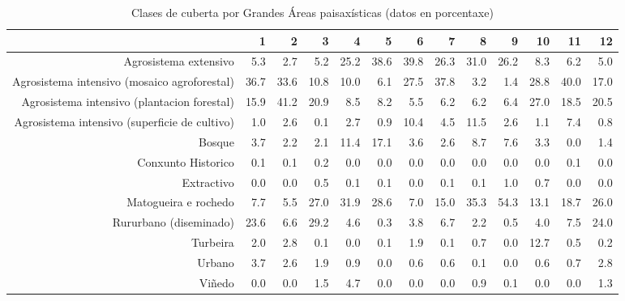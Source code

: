 \begin{table}[p]
\centering
\caption{Clases de cuberta por Grandes Áreas paisaxísticas (datos en porcentaxe)} 
\label{xtaboa2p}
\begin{tabular}{rrrrrrrrrrrrr}
  \hline
 & 1 & 2 & 3 & 4 & 5 & 6 & 7 & 8 & 9 & 10 & 11 & 12 \\ 
  \hline
Agrosistema extensivo & 5.3 & 2.7 & 5.2 & 25.2 & 38.6 & 39.8 & 26.3 & 31.0 & 26.2 & 8.3 & 6.2 & 5.0 \\ 
  Agrosistema intensivo (mosaico agroforestal) & 36.7 & 33.6 & 10.8 & 10.0 & 6.1 & 27.5 & 37.8 & 3.2 & 1.4 & 28.8 & 40.0 & 17.0 \\ 
  Agrosistema intensivo (plantacion forestal) & 15.9 & 41.2 & 20.9 & 8.5 & 8.2 & 5.5 & 6.2 & 6.2 & 6.4 & 27.0 & 18.5 & 20.5 \\ 
  Agrosistema intensivo (superficie de cultivo) & 1.0 & 2.6 & 0.1 & 2.7 & 0.9 & 10.4 & 4.5 & 11.5 & 2.6 & 1.1 & 7.4 & 0.8 \\ 
  Bosque & 3.7 & 2.2 & 2.1 & 11.4 & 17.1 & 3.6 & 2.6 & 8.7 & 7.6 & 3.3 & 0.0 & 1.4 \\ 
  Conxunto Historico & 0.1 & 0.1 & 0.2 & 0.0 & 0.0 & 0.0 & 0.0 & 0.0 & 0.0 & 0.0 & 0.1 & 0.0 \\ 
  Extractivo & 0.0 & 0.0 & 0.5 & 0.1 & 0.1 & 0.0 & 0.1 & 0.1 & 1.0 & 0.7 & 0.0 & 0.0 \\ 
  Matogueira e rochedo & 7.7 & 5.5 & 27.0 & 31.9 & 28.6 & 7.0 & 15.0 & 35.3 & 54.3 & 13.1 & 18.7 & 26.0 \\ 
  Rururbano (diseminado) & 23.6 & 6.6 & 29.2 & 4.6 & 0.3 & 3.8 & 6.7 & 2.2 & 0.5 & 4.0 & 7.5 & 24.0 \\ 
  Turbeira & 2.0 & 2.8 & 0.1 & 0.0 & 0.1 & 1.9 & 0.1 & 0.7 & 0.0 & 12.7 & 0.5 & 0.2 \\ 
  Urbano & 3.7 & 2.6 & 1.9 & 0.9 & 0.0 & 0.6 & 0.6 & 0.1 & 0.0 & 0.6 & 0.7 & 2.8 \\ 
  Viñedo & 0.0 & 0.0 & 1.5 & 4.7 & 0.0 & 0.0 & 0.0 & 0.9 & 0.1 & 0.0 & 0.0 & 1.3 \\ 
   \hline
\end{tabular}
\end{table}
